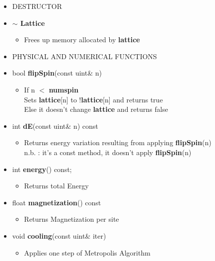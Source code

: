 \begin{itemize}
\begin{itemize}
		
		\item[]
		DESTRUCTOR \\
		
			\item[] \textbf{$\sim$ Lattice}	 
			\begin{itemize}
				\item[] Frees up memory allocated by \textbf{lattice} \\
			\end{itemize}		
		
\newpage 		
	
		\item[] 
		PHYSICAL AND NUMERICAL FUNCTIONS \\
 		
			\item[] bool \textbf{flipSpin}(const uint\& n)		 
			\begin{itemize}
				\item[] If n $<$ \textbf{num\textunderscore spin} \\
				Sets \textbf{lattice}[n] to !\textbf{lattice}[n] and returns true \\
				Else it doesn't change \textbf{lattice} and returns false 
						
			\end{itemize}

			\item[] int \textbf{dE}(const uint\& n) const		 
			\begin{itemize}
				\item[] Returns energy variation resulting from applying \textbf{flipSpin}(n) \\
						{\small
						\textsf{n.b.} : it's a const method, it doesn't apply \textbf{flipSpin}(n)
						} 
			\end{itemize}
			
			\item[] int \textbf{energy}() const;		 
			\begin{itemize}
				\item[] Returns total Energy 
			\end{itemize} 
			
			\item[] float \textbf{magnetization}() const		 
			\begin{itemize}
				\item[] Returns Magnetization per site  
				
			\end{itemize}
			
			\item[] void \textbf{cooling}(const uint\& iter) 		 
			\begin{itemize}
				\item[] Applies one step of Metropolis Algorithm 
			\end{itemize}
			

\end{itemize}
\end{itemize}

